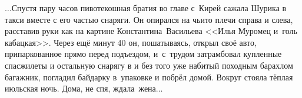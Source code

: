 
\vspace{0.5cm}
$\ldots$Спустя пару часов пивотекошная братия во главе с~Кирей сажала Шурика в такси вместе с его частью снаряги. Он опирался на чьи\sdash то плечи справа и слева, расставив руки как на картине Константина~Васильева <<Илья Муромец и~голь кабацкая>>. Через ещё минут 40 он, пошатываясь, открыл своё авто, припаркованное прямо перед подъездом, и~с~трудом затрамбовал купленные спасжилеты и остальную снарягу в и без того уже набитый походным барахлом багажник, погладил байдарку в~упаковке и побрёл домой. Вокруг стояла тёплая июльская ночь. Дома, не спя, ждала~жена$\ldots$

\begin{center}
\end{center}
